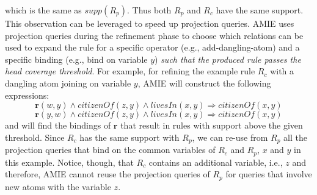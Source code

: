 \noindent which is the same as $supp(R_p)$. Thus both $R_p$ and $R_c$ have the same support.
This observation can be leveraged to speed up projection queries.
AMIE uses projection queries during the refinement phase to choose which relations can be used to expand the rule for 
a specific operator (e.g., add-dangling-atom) and a specific binding (e.g., bind on variable $y$) \emph{such that the produced rule
passes the head coverage threshold}.
For example, for refining the example rule $R_c$ with a dangling atom joining on variable $y$, AMIE will construct the following expressions:
\[
\bm{r}(w,y) \wedge \textit{citizenOf}(z,y)\wedge \textit{livesIn}(x,y)\Rightarrow \textit{citizenOf}(x,y)
\]
\[
\bm{r}(y,w) \wedge \textit{citizenOf}(z,y)\wedge \textit{livesIn}(x,y)\Rightarrow \textit{citizenOf}(x,y)
\]
\noindent and will find the bindings of $\bm{r}$ that result in rules with support above the given threshold.
Since $R_c$ has the same support with $R_p$, we can re-use from $R_p$ all the projection queries  that bind on the 
common variables of $R_c$ and $R_p$, $x$ and $y$ in this example. Notice, though, that $R_c$
contains an additional variable, i.e., $z$ and therefore, AMIE cannot reuse the projection queries
of $R_p$ for queries that involve new atoms with the variable $z$.




